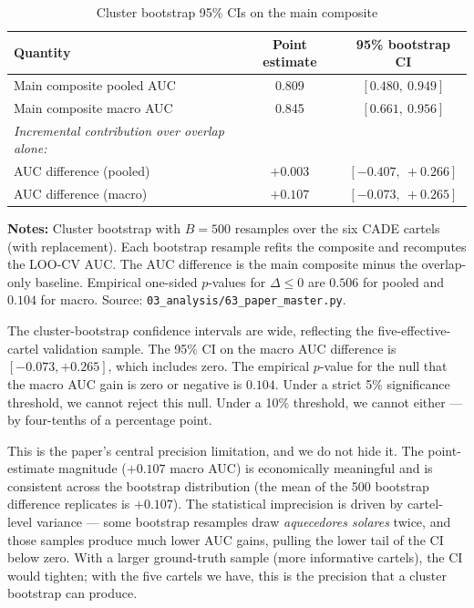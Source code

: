 \begin{table}[htbp]
\centering
\caption{Cluster bootstrap 95\% CIs on the main composite}\label{tab:boot_ci}
\small
\begin{tabular}{lcc}
\toprule
Quantity & Point estimate & 95\% bootstrap CI \\
\midrule
Main composite pooled AUC                              & 0.809 & $[0.480,\ 0.949]$ \\
Main composite macro AUC                               & 0.845 & $[0.661,\ 0.956]$ \\[4pt]
\emph{Incremental contribution over overlap alone:} \\
\quad AUC difference (pooled)                          & $+0.003$ & $[-0.407,\ +0.266]$ \\
\quad AUC difference (macro)                           & $+0.107$ & $[-0.073,\ +0.265]$ \\
\bottomrule
\end{tabular}
\vspace{0.5em}
\begin{minipage}{0.95\textwidth}
\scriptsize{\textbf{Notes:} Cluster bootstrap with $B = 500$ resamples over the six CADE cartels (with replacement). Each bootstrap resample refits the composite and recomputes the LOO-CV AUC. The AUC difference is the main composite minus the overlap-only baseline. Empirical one-sided $p$-values for $\Delta \leq 0$ are $0.506$ for pooled and $0.104$ for macro. Source: \texttt{03\_analysis/63\_paper\_master.py}.\par}
\end{minipage}
\end{table}

The cluster-bootstrap confidence intervals are wide, reflecting the five-effective-cartel validation sample. The 95\% CI on the macro AUC difference is $[-0.073, +0.265]$, which includes zero. The empirical $p$-value for the null that the macro AUC gain is zero or negative is $0.104$. Under a strict 5\% significance threshold, we cannot reject this null. Under a 10\% threshold, we cannot either --- by four-tenths of a percentage point.

This is the paper's central precision limitation, and we do not hide it. The point-estimate magnitude ($+0.107$ macro AUC) is economically meaningful and is consistent across the bootstrap distribution (the mean of the 500 bootstrap difference replicates is $+0.107$). The statistical imprecision is driven by cartel-level variance --- some bootstrap resamples draw \emph{aquecedores solares} twice, and those samples produce much lower AUC gains, pulling the lower tail of the CI below zero. With a larger ground-truth sample (more informative cartels), the CI would tighten; with the five cartels we have, this is the precision that a cluster bootstrap can produce.

